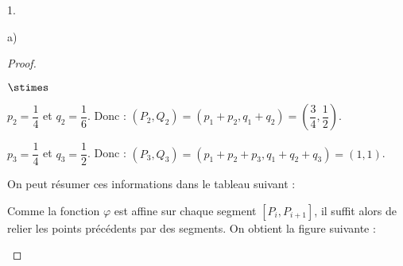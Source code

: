 \begin{noliste}{1.}
\begin{noliste}{a)}
\begin{proof}
\begin{noliste}{$\stimes$}
    \item $p_2=\dfrac{1}{4}$ et $q_2=\dfrac{1}{6}$. Donc : $(P_2,Q_2)
    =(p_1+p_2,q_1+q_2) = \left(\dfrac{3}{4}, \dfrac{1}{2}\right)$.
    
    \item $p_3=\dfrac{1}{4}$ et $q_3 = \dfrac{1}{2}$. Donc : 
    $(P_3, Q_3) = (p_1+p_2+p_3, q_1+q_2+q_3) = (1,1)$.
  \end{noliste}
  On peut résumer ces informations dans le tableau suivant : %
  
  \begin{center}
  \end{center}
  Comme la fonction $\varphi$ est affine sur chaque segment $[P_i, 
  P_{i+1}]$, il suffit alors de relier les points précédents par des 
  segments. On obtient la figure suivante :~\\[-.6cm]
    \begin{center}
%               
% 
%       
%       
%       

\end{center}
\end{proof}
\end{noliste}
\end{noliste}
